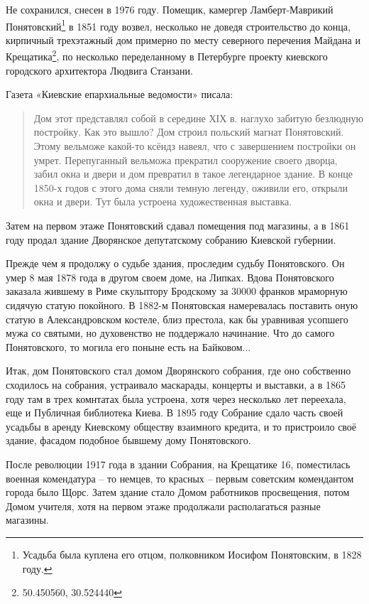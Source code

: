 Не сохранился, снесен в 1976 году. Помещик, камергер Ламберт-Маврикий Понятовский\footnote{Усадьба была куплена его отцом, полковником Иосифом Понятовским, в 1828 году.} в 1851 году 
возвел, несколько не доведя строительство до конца, кирпичный трехэтажный дом примерно по месту северного перечения Майдана и Крещатика\footnote{50.450560, 30.524440}, по несколько переделанному в Петербурге проекту киевского городского архитектора Людвига Станзани.

Газета «Киевские епархиальные ведомости» писала:

\begin{quotation}
Дом этот представлял собой в середине ХІХ в. наглухо забитую безлюдную постройку. Как это вышло? Дом строил польский магнат Понятовский. Этому вельможе какой-то ксёндз навеял, что с завершением постройки он умрет. Перепуганный вельможа прекратил сооружение своего дворца, забил окна и двери и дом превратил в такое легендарное здание. В конце 1850-х годов с этого дома сняли темную легенду, оживили его, открыли окна и двери. Тут была устроена художественная выставка.\end{quotation}

Затем на первом этаже Понятовский сдавал помещения под магазины, а в 1861 году продал здание Дворянское депутатскому собранию Киевской губернии.

Прежде чем я продолжу о судьбе здания, проследим судьбу Понятовского. Он умер 8 мая 1878 года в другом своем доме, на Липках. Вдова Понятовского заказала жившему в Риме скульптору Бродскому за 30000 франков мраморную сидячую статую покойного. В 1882-м Понятовская намеревалась поставить оную статую в Александровском костеле, близ престола, как бы уравнивая усопшего мужа со святыми, но духовенство не поддержало начинание. Что до самого Понятовского, то могила его поныне есть на Байковом...

Итак, дом Понятовского стал домом Дворянского собрания, где оно собственно сходилось на собрания, устраивало маскарады, концерты и выставки, а в 1865 году там в трех комнтатах была устроена, хотя через несколько лет переехала, еще и Публичная библиотека Киева. В 1895 году Собрание сдало часть своей усадьбы в аренду Киевскому обществу взаимного кредита, и то пристроило своё здание, фасадом подобное бывшему дому Понятовского. 

После революции 1917 года в здании Собрания, на Крещатике 16, поместилась военная комендатура – то немцев, то красных – первым советским комендантом города было Щорс. Затем здание стало Домом работников просвещения, потом Домом учителя, хотя на первом этаже продолжали располагаться разные магазины.

